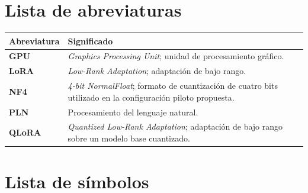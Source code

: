
\clearpage
{}
{}
\tableofcontents

\clearpage
{}
{}
\renewcommand{\listtablename}{Índice de tablas}
\renewcommand{\tablename}{Tabla}
\listoftables

\clearpage
{}
{}
\renewcommand{\listfigurename}{Índice de figuras}
\listoffigures

\clearpage
{}
{}

\clearpage
{}
{}
\chapter*{Lista de abreviaturas}

\begin{table}[H]
\centering
\small
\begin{tabularx}{\textwidth}{@{}P{2.7cm}L@{}}
\toprule
{}
\textbf{Abreviatura} & \textbf{Significado} \\
\midrule
\textbf{GPU} & \textit{Graphics Processing Unit}; unidad de procesamiento gráfico. \\
\textbf{LoRA} & \textit{Low-Rank Adaptation}; adaptación de bajo rango. \\
\textbf{NF4} & \textit{4-bit NormalFloat}; formato de cuantización de cuatro bits utilizado en la configuración piloto propuesta. \\
\textbf{PLN} & Procesamiento del lenguaje natural. \\
\textbf{QLoRA} & \textit{Quantized Low-Rank Adaptation}; adaptación de bajo rango sobre un modelo base cuantizado. \\
\bottomrule
\end{tabularx}
\end{table}

\clearpage
{}
{}
\chapter*{Lista de símbolos}

